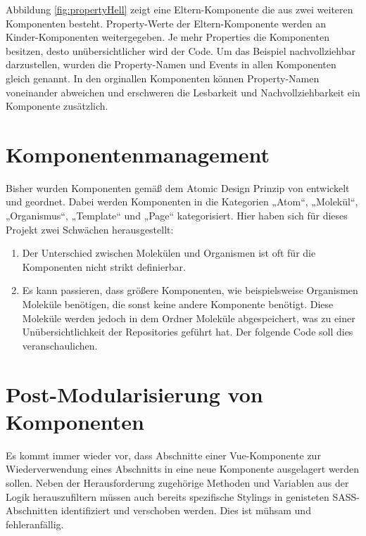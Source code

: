 Abbildung \ref{fig:propertyHell} zeigt eine Eltern-Komponente die aus zwei weiteren Komponenten besteht. Property-Werte der Eltern-Komponente werden an Kinder-Komponenten weitergegeben. Je mehr Properties die Komponenten besitzen, desto unübersichtlicher wird der Code. Um das Beispiel nachvollziehbar darzustellen, wurden die Property-Namen und Events in allen Komponenten gleich genannt. In den orginallen Komponenten können Property-Namen voneinander abweichen und erschweren die Lesbarkeit und Nachvollziehbarkeit ein Komponente zusätzlich.
 
\section{Komponentenmanagement}
\label{sec:componentManagement}
Bisher wurden Komponenten gemäß dem Atomic Design Prinzip von \cite{AtomicDesign} entwickelt und geordnet. Dabei werden Komponenten in die Kategorien „Atom“, „Molekül“, „Organismus“, „Template“ und „Page“ kategorisiert. Hier haben sich für dieses Projekt zwei Schwächen herausgestellt:
\begin{enumerate}
 \item Der Unterschied zwischen Molekülen und Organismen ist oft für die Komponenten nicht strikt definierbar.
 \item Es kann passieren, dass größere Komponenten, wie beispielsweise Organismen Moleküle benötigen, die sonst keine andere Komponente benötigt. Diese Moleküle werden jedoch in dem Ordner Moleküle abgespeichert, was zu einer Unübersichtlichkeit der Repositories geführt hat. Der folgende Code soll dies veranschaulichen.
\end{enumerate}



\section{Post-Modularisierung von Komponenten}
\label{sec:postSplitting}
Es kommt immer wieder vor, dass Abschnitte einer Vue-Komponente zur Wiederverwendung eines Abschnitts in eine neue Komponente ausgelagert werden sollen. Neben der Herausforderung zugehörige Methoden und Variablen aus der Logik herauszufiltern müssen auch bereits spezifische Stylings in genisteten SASS-Abschnitten identifiziert und verschoben werden. Dies ist mühsam und fehleranfällig.

